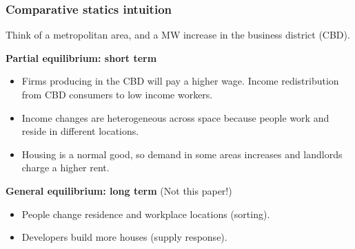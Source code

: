 \documentclass[aspectratio=169, t]{beamer}
\begin{document}
\begin{frame}
	\frametitle{Comparative statics intuition}
    
    \vspace{3mm}
    
	Think of a metropolitan area, and a MW increase in the business district (CBD). 
	
	\vspace{3mm}
	
    \textbf{Partial equilibrium: short term}
	\begin{itemize}
		\vspace{.5mm} \item Firms producing in the CBD will pay a higher wage. Income 
		redistribution from CBD consumers to low income workers.
		\vspace{.5mm} \item Income changes are heterogeneous across space because people work 
		and reside in different locations.
		\vspace{.5mm} \item Housing is a normal good, so demand in some areas increases 
		and landlords charge a higher rent.
	\end{itemize}

	\pause
	\vspace{3mm}
	\textbf{General equilibrium: long term} (Not this paper!)
	\begin{itemize}
	\vspace{.5mm} \item People change residence and workplace locations (sorting).
	\vspace{.5mm} \item Developers build more houses (supply response).
\end{itemize}
\end{frame}
\end{document}
